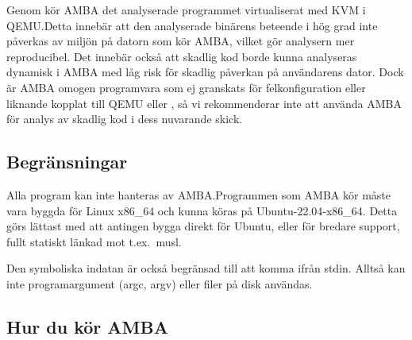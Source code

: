 Genom \stoe{} kör AMBA det analyserade programmet virtualiserat med KVM i
QEMU.\@ Detta innebär att den analyserade binärens beteende i hög grad inte
påverkas av miljön på datorn som kör AMBA, vilket gör analysern mer
reproducibel. Det innebär också att skadlig kod borde kunna analyseras dynamisk
i AMBA med låg risk för skadlig påverkan på användarens dator. Dock är AMBA
omogen programvara som ej granskats för felkonfiguration eller liknande kopplat
till QEMU eller \stoe{}, så vi rekommenderar inte att använda AMBA för analys av
skadlig kod i dess nuvarande skick.

\subsection{Begränsningar}

Alla program kan inte hanteras av AMBA.\@ Programmen som AMBA kör måste vara
byggda för Linux x86\_64 och kunna köras på Ubuntu-22.04-x86\_64. Detta görs
lättast med att antingen bygga direkt för Ubuntu, eller för bredare support,
fullt statiskt länkad mot t.ex.\ musl.

Den symboliska indatan är också begränsad till att komma ifrån
stdin. Alltså kan inte programargument (argc, argv) eller filer på
disk användas.

\subsection{Hur du kör AMBA}
